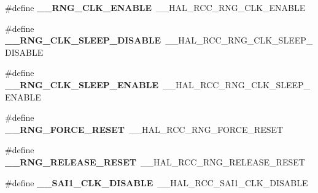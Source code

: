 \begin{DoxyCompactItemize}
\item 
\#define {\bfseries \+\_\+\+\_\+\+R\+N\+G\+\_\+\+C\+L\+K\+\_\+\+E\+N\+A\+B\+LE}~\+\_\+\+\_\+\+H\+A\+L\+\_\+\+R\+C\+C\+\_\+\+R\+N\+G\+\_\+\+C\+L\+K\+\_\+\+E\+N\+A\+B\+LE\hypertarget{group___h_a_l___r_c_c___aliased_ga766db26e2cb32163c41af63ea098d17b}{}\label{group___h_a_l___r_c_c___aliased_ga766db26e2cb32163c41af63ea098d17b}

\item 
\#define {\bfseries \+\_\+\+\_\+\+R\+N\+G\+\_\+\+C\+L\+K\+\_\+\+S\+L\+E\+E\+P\+\_\+\+D\+I\+S\+A\+B\+LE}~\+\_\+\+\_\+\+H\+A\+L\+\_\+\+R\+C\+C\+\_\+\+R\+N\+G\+\_\+\+C\+L\+K\+\_\+\+S\+L\+E\+E\+P\+\_\+\+D\+I\+S\+A\+B\+LE\hypertarget{group___h_a_l___r_c_c___aliased_gacb8c82d2f6524d61f53f4d744b1ea469}{}\label{group___h_a_l___r_c_c___aliased_gacb8c82d2f6524d61f53f4d744b1ea469}

\item 
\#define {\bfseries \+\_\+\+\_\+\+R\+N\+G\+\_\+\+C\+L\+K\+\_\+\+S\+L\+E\+E\+P\+\_\+\+E\+N\+A\+B\+LE}~\+\_\+\+\_\+\+H\+A\+L\+\_\+\+R\+C\+C\+\_\+\+R\+N\+G\+\_\+\+C\+L\+K\+\_\+\+S\+L\+E\+E\+P\+\_\+\+E\+N\+A\+B\+LE\hypertarget{group___h_a_l___r_c_c___aliased_ga986bcd5b8c1fcb8798117ab1fa762e28}{}\label{group___h_a_l___r_c_c___aliased_ga986bcd5b8c1fcb8798117ab1fa762e28}

\item 
\#define {\bfseries \+\_\+\+\_\+\+R\+N\+G\+\_\+\+F\+O\+R\+C\+E\+\_\+\+R\+E\+S\+ET}~\+\_\+\+\_\+\+H\+A\+L\+\_\+\+R\+C\+C\+\_\+\+R\+N\+G\+\_\+\+F\+O\+R\+C\+E\+\_\+\+R\+E\+S\+ET\hypertarget{group___h_a_l___r_c_c___aliased_gae619bcc84a660ded8baf711bfaca4069}{}\label{group___h_a_l___r_c_c___aliased_gae619bcc84a660ded8baf711bfaca4069}

\item 
\#define {\bfseries \+\_\+\+\_\+\+R\+N\+G\+\_\+\+R\+E\+L\+E\+A\+S\+E\+\_\+\+R\+E\+S\+ET}~\+\_\+\+\_\+\+H\+A\+L\+\_\+\+R\+C\+C\+\_\+\+R\+N\+G\+\_\+\+R\+E\+L\+E\+A\+S\+E\+\_\+\+R\+E\+S\+ET\hypertarget{group___h_a_l___r_c_c___aliased_ga24e421e3737cdb35e854520e14f29266}{}\label{group___h_a_l___r_c_c___aliased_ga24e421e3737cdb35e854520e14f29266}

\item 
\#define {\bfseries \+\_\+\+\_\+\+S\+A\+I1\+\_\+\+C\+L\+K\+\_\+\+D\+I\+S\+A\+B\+LE}~\+\_\+\+\_\+\+H\+A\+L\+\_\+\+R\+C\+C\+\_\+\+S\+A\+I1\+\_\+\+C\+L\+K\+\_\+\+D\+I\+S\+A\+B\+LE\hypertarget{group___h_a_l___r_c_c___aliased_ga037179746d806a9eb830087a3d11a184}{}\label{group___h_a_l___r_c_c___aliased_ga037179746d806a9eb830087a3d11a184}


\end{DoxyCompactItemize}
